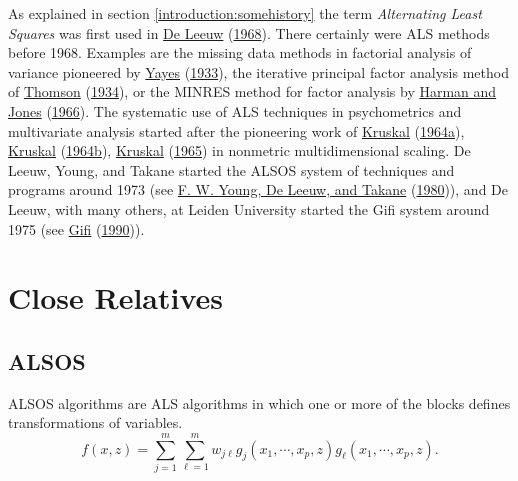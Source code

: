 \documentclass[
  12pt,
]{book}
\begin{document}
As explained in section \ref{introduction:somehistory} the term \emph{Alternating Least Squares} was first used in \protect\hyperlink{ref-deleeuw_R_68d}{De Leeuw} (\protect\hyperlink{ref-deleeuw_R_68d}{1968}). There certainly were ALS methods before 1968. Examples are the missing data methods in factorial analysis of variance pioneered by \protect\hyperlink{ref-yates_33}{Yayes} (\protect\hyperlink{ref-yates_33}{1933}), the iterative principal factor analysis method of \protect\hyperlink{ref-thomson_34}{Thomson} (\protect\hyperlink{ref-thomson_34}{1934}), or the MINRES method for factor analysis by \protect\hyperlink{ref-harman_jones_66}{Harman and Jones} (\protect\hyperlink{ref-harman_jones_66}{1966}). The systematic use of ALS techniques in psychometrics and multivariate analysis started after
the pioneering work of \protect\hyperlink{ref-kruskal_64a}{Kruskal} (\protect\hyperlink{ref-kruskal_64a}{1964a}), \protect\hyperlink{ref-kruskal_64b}{Kruskal} (\protect\hyperlink{ref-kruskal_64b}{1964b}), \protect\hyperlink{ref-kruskal_65}{Kruskal} (\protect\hyperlink{ref-kruskal_65}{1965}) in nonmetric multidimensional scaling.
De Leeuw, Young, and Takane started the ALSOS system of techniques and programs around 1973
(see \protect\hyperlink{ref-young_deleeuw_takane_C_80}{F. W. Young, De Leeuw, and Takane} (\protect\hyperlink{ref-young_deleeuw_takane_C_80}{1980})),
and De Leeuw, with many others, at Leiden University started the Gifi system around 1975 (see \protect\hyperlink{ref-gifi_B_90}{Gifi} (\protect\hyperlink{ref-gifi_B_90}{1990})).

\hypertarget{alternatingleastsquares:closerelatives}{%
\section{Close Relatives}\label{alternatingleastsquares:closerelatives}}

\hypertarget{alternatingleastsquares:closerelatives:alsos}{%
\subsection{ALSOS}\label{alternatingleastsquares:closerelatives:alsos}}

ALSOS algorithms are ALS algorithms in which one or more of the blocks defines transformations of variables.
\[
f(x,z)=\sum_{j=1}^m\sum_{\ell=1}^mw_{j\ell}g_j(x_1,\cdots,x_p,z)g_\ell(x_1,\cdots,x_p,z).
\]
\end{document}
